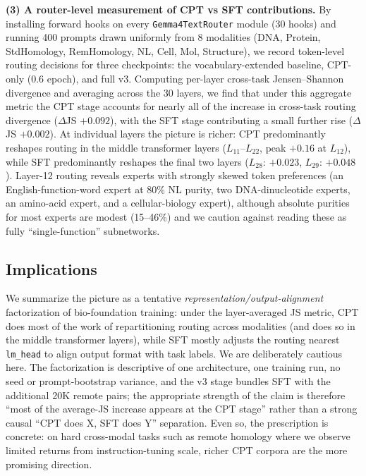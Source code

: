 \documentclass[11pt]{article}
\begin{document}
\textbf{(3) A router-level measurement of CPT vs SFT contributions.} By installing forward hooks on every \texttt{Gemma4TextRouter} module (30 hooks) and running 400 prompts drawn uniformly from 8 modalities (DNA, Protein, StdHomology, RemHomology, NL, Cell, Mol, Structure), we record token-level routing decisions for three checkpoints: the vocabulary-extended baseline, CPT-only (0.6 epoch), and full v3. Computing per-layer cross-task Jensen--Shannon divergence and averaging across the 30 layers, we find that under this aggregate metric the CPT stage accounts for nearly all of the increase in cross-task routing divergence ($\Delta$JS $+0.092$), with the SFT stage contributing a small further rise ($\Delta$JS $+0.002$). At individual layers the picture is richer: CPT predominantly reshapes routing in the middle transformer layers ($L_{11}$--$L_{22}$, peak $+0.16$ at $L_{12}$), while SFT predominantly reshapes the final two layers ($L_{28}$: $+0.023$, $L_{29}$: $+0.048$). Layer-12 routing reveals experts with strongly skewed token preferences (an English-function-word expert at 80\% NL purity, two DNA-dinucleotide experts, an amino-acid expert, and a cellular-biology expert), although absolute purities for most experts are modest (15--46\%) and we caution against reading these as fully ``single-function'' subnetworks.

\subsection*{Implications}

We summarize the picture as a tentative \emph{representation/output-alignment} factorization of bio-foundation training: under the layer-averaged JS metric, CPT does most of the work of repartitioning routing across modalities (and does so in the middle transformer layers), while SFT mostly adjusts the routing nearest \texttt{lm\_head} to align output format with task labels. We are deliberately cautious here. The factorization is descriptive of one architecture, one training run, no seed or prompt-bootstrap variance, and the v3 stage bundles SFT with the additional 20K remote pairs; the appropriate strength of the claim is therefore ``most of the average-JS increase appears at the CPT stage'' rather than a strong causal ``CPT does X, SFT does Y'' separation. Even so, the prescription is concrete: on hard cross-modal tasks such as remote homology where we observe limited returns from instruction-tuning scale, richer CPT corpora are the more promising direction.
\end{document}
